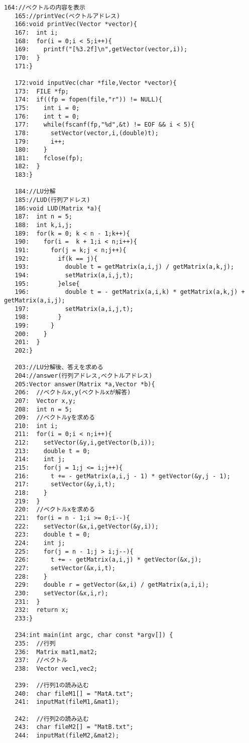 \documentclass[12pt,a4j]{jarticle}
\begin{document}
\begin{lstlisting}[basicstyle=\ttfamily,breaklines=true,frame=single]
   164://ベクトルの内容を表示
   165://printVec(ベクトルアドレス)
   166:void printVec(Vector *vector){
   167:  int i;
   168:  for(i = 0;i < 5;i++){
   169:    printf("[%3.2f]\n",getVector(vector,i));
   170:  }
   171:}
       
   172:void inputVec(char *file,Vector *vector){
   173:  FILE *fp;
   174:  if((fp = fopen(file,"r")) != NULL){
   175:    int i = 0;
   176:    int t = 0;
   177:    while(fscanf(fp,"%d",&t) != EOF && i < 5){
   178:      setVector(vector,i,(double)t);
   179:      i++;
   180:    }
   181:    fclose(fp);
   182:  }
   183:}
       
   184://LU分解
   185://LUD(行列アドレス)
   186:void LUD(Matrix *a){
   187:  int n = 5;
   188:  int k,i,j;
   189:  for(k = 0; k < n - 1;k++){
   190:    for(i =  k + 1;i < n;i++){
   191:      for(j = k;j < n;j++){
   192:        if(k == j){
   193:          double t = getMatrix(a,i,j) / getMatrix(a,k,j);
   194:          setMatrix(a,i,j,t);
   195:        }else{
   196:          double t = - getMatrix(a,i,k) * getMatrix(a,k,j) + getMatrix(a,i,j);
   197:          setMatrix(a,i,j,t);
   198:        }
   199:      }
   200:    }
   201:  }
   202:}
       
   203://LU分解後、答えを求める
   204://answer(行列アドレス,ベクトルアドレス)
   205:Vector answer(Matrix *a,Vector *b){
   206:  //ベクトルx,y(ベクトルxが解答)
   207:  Vector x,y;
   208:  int n = 5;
   209:  //ベクトルyを求める
   210:  int i;
   211:  for(i = 0;i < n;i++){
   212:    setVector(&y,i,getVector(b,i));
   213:    double t = 0;
   214:    int j;
   215:    for(j = 1;j <= i;j++){
   216:      t += - getMatrix(a,i,j - 1) * getVector(&y,j - 1);
   217:      setVector(&y,i,t);
   218:    }
   219:  }
   220:  //ベクトルxを求める
   221:  for(i = n - 1;i >= 0;i--){
   222:    setVector(&x,i,getVector(&y,i));
   223:    double t = 0;
   224:    int j;
   225:    for(j = n - 1;j > i;j--){
   226:      t += - getMatrix(a,i,j) * getVector(&x,j);
   227:      setVector(&x,i,t);
   228:    }
   229:    double r = getVector(&x,i) / getMatrix(a,i,i);
   230:    setVector(&x,i,r);
   231:  }
   232:  return x;
   233:}
       
   234:int main(int argc, char const *argv[]) {
   235:  //行列
   236:  Matrix mat1,mat2;
   237:  //ベクトル
   238:  Vector vec1,vec2;
       
   239:  //行列1の読み込む
   240:  char fileM1[] = "MatA.txt";
   241:  inputMat(fileM1,&mat1);
       
   242:  //行列2の読み込む
   243:  char fileM2[] = "MatB.txt";
   244:  inputMat(fileM2,&mat2);
       

\end{lstlisting}
\end{document}
